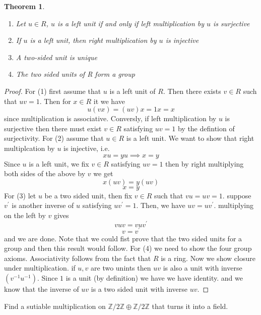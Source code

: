\documentclass[11pt,largemargins]{homework}
\newcommand{\Z}{\mathbb{Z}}
\newtheorem{theorem}{Theorem}
\begin{document}
\maketitle
\begin{theorem}
    \begin{enumerate}
        \item Let $u \in R$, $u$ is a left unit if and only if left multiplication by $u$ is surjective
        \item If $u$ is a left unit, then right multiplication by $u$ is injective
        \item A two-sided unit is unique
        \item The two sided units of R form a group
    \end{enumerate}
\end{theorem}

\begin{proof}
    For (1) first assume that $u$ is a left unit of $R$. Then there exists $v \in R$ such that 
    $uv = 1$. Then for $x \in R$ it we have 
    \[u (vx) = (uv) x = 1x = x\]
    since multiplication is associative. Conversly, if left multiplication by $u$ is surjective then 
    there must exist $v \in R$ satisfying $uv = 1$ by the defintion of surjectivity. 
    For (2) assume that $u \in R$ is a left unit. We want to show that right multiplcation by $u$ is injective, i.e. 
    \[xu = yu \implies x = y\]
    Since $u$ is a left unit, we fix $v \in R$ satisfying $uv = 1$ then by right multiplying both sides of the above by $v$ we get 
    \[x (uv) = y(uv) \]
    \[x = y \]
    For (3) let $u$ be a two sided unit, then fix $v \in R$ such that $vu = uv = 1$. 
    suppose $v^\prime $ is another inverse of $u$ satisfying $uv^\prime = 1$. 
    Then, we have $uv = uv^\prime$. multiplying on the left by $v$ gives 
    \[vuv = vuv^\prime\]
    \[v = v^\prime\]
    and we are done. Note that we could fist prove that the two sided units for a group and then 
    this result would follow.  
    For (4) we need to show the four group axioms. Associativity follows from the fact that $R$ is a ring. Now we show closure under multiplication. if $u, v$ are two unints
    then $uv$ is also a unit with inverse $(v^{-1}u^{-1})$. Since $1$ is a unit (by definition) we have we have identity.
    and we know that the inverse of $uv$ is a two sided unit with inverse $uv$. 

\end{proof}

\question
Find a sutiable multiplication on $\Z / 2\Z \oplus \Z / 2\Z$ that turns it into 
a field. 
\end{document}
